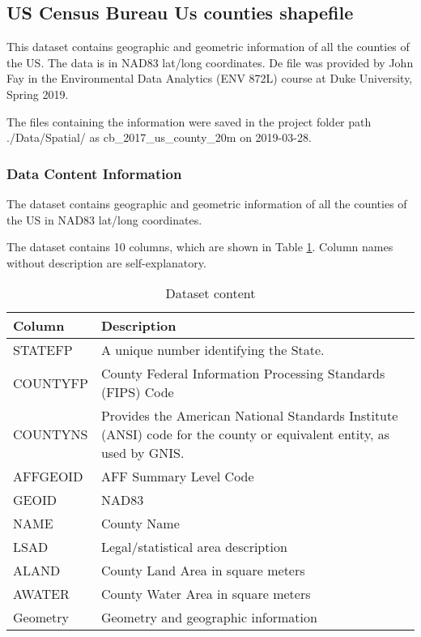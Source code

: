 \documentclass[12pt,]{article}
\begin{document}
\subsection{US Census Bureau Us counties
shapefile}\label{us-census-bureau-us-counties-shapefile}

This dataset contains geographic and geometric information of all the
counties of the US. The data is in NAD83 lat/long coordinates. De file
was provided by John Fay in the Environmental Data Analytics (ENV 872L)
course at Duke University, Spring 2019.

The files containing the information were saved in the project folder
path ./Data/Spatial/ as cb\_2017\_us\_county\_20m on 2019-03-28.

\subsubsection{Data Content
Information}\label{data-content-information-3}

The dataset contains geographic and geometric information of all the
counties of the US in NAD83 lat/long coordinates.

The dataset contains 10 columns, which are shown in Table
\ref{tab:tab8}. Column names without description are self-explanatory.

\begin{table}[ht]
\centering
\begin{tabular}{p{2.5in}p{3.5in}}
  \hline
Column & Description \\ 
  \hline
STATEFP & A unique number identifying the State. \\ 
  COUNTYFP & County Federal Information Processing Standards (FIPS) Code \\ 
  COUNTYNS & Provides the American National Standards Institute (ANSI) code for the county or equivalent entity, as used by GNIS. \\ 
  AFFGEOID & AFF Summary Level Code \\ 
  GEOID & NAD83 \\ 
  NAME & County Name \\ 
  LSAD & Legal/statistical area description \\ 
  ALAND & County Land Area in square meters \\ 
  AWATER & County Water Area in square meters \\ 
  Geometry & Geometry and geographic information \\ 
   \hline
\end{tabular}
\caption{Dataset content} 
\label{tab:tab8}
\end{table}
\end{document}
